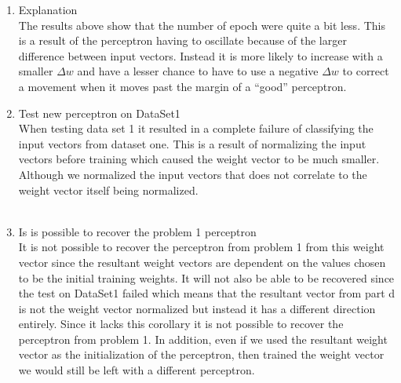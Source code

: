 \begin{enumerate}
\begin{enumerate}
			\item{Explanation} \\
				\textnormal{The results above show that the number of epoch were quite a bit less. This is a result of the perceptron having to oscillate because of the larger difference between input vectors. Instead it is more likely to increase with a smaller \(\Delta w\) and have a lesser chance to have to use a negative  \(\Delta w\) to correct a movement when it moves past the margin of a ``good'' perceptron.}
			\item{Test new perceptron on DataSet1} \\
				\textnormal{When testing data set 1 it resulted in a complete failure of classifying the input vectors from dataset one.  This is a result of normalizing the input vectors before training which caused the weight vector to be much smaller.  Although we normalized the input vectors that does not correlate to the weight vector itself being normalized. } \\ \\
			\item{Is is possible to recover the problem 1 perceptron} \\
				\textnormal{It is not possible to recover the perceptron from problem 1 from this weight vector since the resultant weight vectors are dependent on the values chosen to be the initial training weights.  It will not also be able to be recovered since the test on DataSet1 failed which means that the resultant vector from part d is not the weight vector normalized but instead it has a different direction entirely.  Since it lacks this corollary it is not possible to recover the perceptron from problem 1.  In addition, even if we used the resultant weight vector as the initialization of the perceptron, then trained the weight vector we would still be left with a different perceptron.}
				
			
		\end{enumerate}
\end{enumerate}


